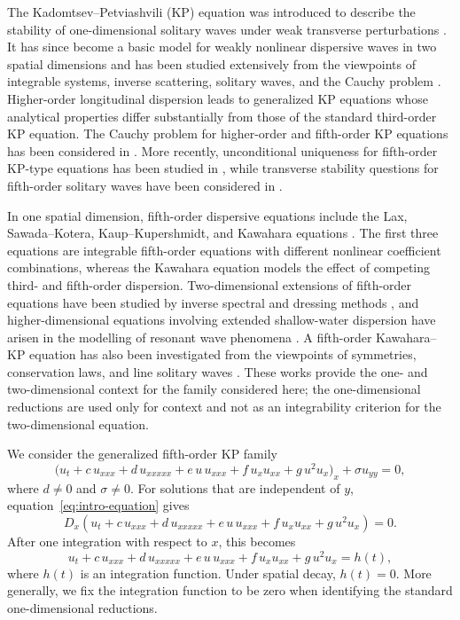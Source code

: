 \documentclass[11pt]{article}
\numberwithin{equation}{section}
\theoremstyle{definition}
\theoremstyle{remark}
\begin{document}
The Kadomtsev--Petviashvili (KP) equation was introduced to describe
the stability of one-dimensional solitary waves under weak transverse
perturbations \cite{KadomtsevPetviashvili1970}. It has since become a
basic model for weakly nonlinear dispersive waves in two spatial
dimensions and has been studied extensively from the viewpoints of
integrable systems, inverse scattering, solitary waves, and the
Cauchy problem
\cite{AblowitzClarkson1991,Konopelchenko1993,KleinSaut2021}.
Higher-order longitudinal dispersion leads to generalized KP
equations whose analytical properties differ substantially from those
of the standard third-order KP equation. The Cauchy problem for higher-order and fifth-order KP equations has
been considered in
\cite{SautTzvetkov1999,SautTzvetkov2000}. More recently,
unconditional uniqueness for fifth-order KP-type equations has been
studied in \cite{Patterson2025}, while transverse stability questions
for fifth-order solitary waves have been considered in
\cite{Karpman1993}.

In one spatial dimension, fifth-order dispersive equations include
the Lax, Sawada--Kotera, Kaup--Kupershmidt, and Kawahara equations
\cite{Lax1968,SawadaKotera1974,Kaup1980,Kupershmidt1985,Kawahara1972}.
The first three equations are integrable fifth-order equations with
different nonlinear coefficient combinations, whereas the Kawahara
equation models the effect of competing third- and fifth-order
dispersion. Two-dimensional extensions of fifth-order equations have
been studied by inverse spectral and dressing methods
\cite{Konopelchenko1993,DubrovskyTopovskyBasalaev2010}, and
higher-dimensional equations involving extended shallow-water
dispersion have arisen in the modelling of resonant wave phenomena
\cite{HorikisFrantzeskakisMarchantSmyth2021}. A fifth-order
Kawahara--KP equation has also been investigated from the viewpoints
of symmetries, conservation laws, and line solitary waves
\cite{MarquezLozanoGandariasAnco2023}. These works provide the
one- and two-dimensional context for the family considered here; the
one-dimensional reductions are used only for context and not as an
integrability criterion for the two-dimensional equation.

We consider the generalized fifth-order KP family
\begin{equation}
\bigl(
u_t
+c\,u_{xxx}
+d\,u_{xxxxx}
+e\,u\,u_{xxx}
+f\,u_xu_{xx}
+g\,u^2u_x
\bigr)_x
+\sigma u_{yy}
=0,
\label{eq:intro-equation}
\end{equation}
where $d\neq0$ and $\sigma\neq0$. For solutions that are independent
of $y$, equation~\eqref{eq:intro-equation} gives
\begin{equation*}
D_x\left(
u_t
+c\,u_{xxx}
+d\,u_{xxxxx}
+e\,u\,u_{xxx}
+f\,u_xu_{xx}
+g\,u^2u_x
\right)=0.
\end{equation*}
After one integration with respect to $x$, this becomes
\begin{equation}
u_t
+c\,u_{xxx}
+d\,u_{xxxxx}
+e\,u\,u_{xxx}
+f\,u_xu_{xx}
+g\,u^2u_x
=h(t),
\label{eq:one-dimensional-reduction}
\end{equation}
where $h(t)$ is an integration function. Under spatial decay, $h(t)=0$. More generally, we fix the integration
function to be zero when identifying the standard one-dimensional
reductions.
\end{document}
